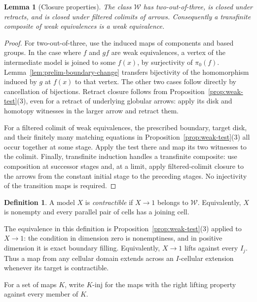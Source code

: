 \documentclass[11pt,letterpaper]{article}
\numberwithin{equation}{section}
\theoremstyle{plain}
\newtheorem{lemma}[theorem]{Lemma}
\theoremstyle{definition}
\newtheorem{definition}[theorem]{Definition}
\theoremstyle{remark}
\begin{document}
\begin{lemma}[Closure properties]\label{lem:weak-closure}
The class $\mathcal W$ has two-out-of-three, is closed under
retracts, and is closed under filtered colimits of arrows.
Consequently a transfinite composite of weak equivalences is
a weak equivalence.
\end{lemma}

\begin{proof}
For two-out-of-three, use the induced maps of components and
based groups.  In the case where $f$ and $gf$ are weak
equivalences, a vertex of the intermediate model is joined to
some $f(x)$, by surjectivity of $\pi_0(f)$.
Lemma~\ref{lem:prelim-boundary-change} transfers bijectivity
of the homomorphism induced by $g$ at $f(x)$ to that vertex.
The other two cases follow directly by cancellation of
bijections.  Retract closure follows from
Proposition~\ref{prop:weak-test}(3), even for a retract of
underlying globular arrows: apply its disk and homotopy
witnesses in the larger arrow and retract them.

For a filtered colimit of weak equivalences, the prescribed
boundary, target disk, and their finitely many matching
equations in Proposition~\ref{prop:weak-test}(3) all occur
together at some stage.  Apply the test there and map its
two witnesses to the colimit.  Finally, transfinite induction
handles a transfinite composite: use composition at successor
stages and, at a limit, apply filtered-colimit closure to the
arrows from the constant initial stage to the preceding stages.
No injectivity of the transition maps is required.
\end{proof}

\begin{definition}\label{def:prelim-contractible}
A model $X$ is \emph{contractible} if $X\to1$ belongs to
$\mathcal W$.  Equivalently, $X$ is nonempty and every
parallel pair of cells has a joining cell.
\end{definition}

The equivalence in this definition is
Proposition~\ref{prop:weak-test}(3) applied to $X\to1$:
the condition in dimension zero is nonemptiness, and in
positive dimension it is exact boundary filling.  Equivalently,
$X\to1$ lifts against every $I_j$.  Thus a map from any
cellular domain extends across an $I$-cellular extension
whenever its target is contractible.

For a set of maps $K$, write $K\text{-}\mathrm{inj}$ for the maps
with the right lifting property against every member of $K$.
\end{document}
